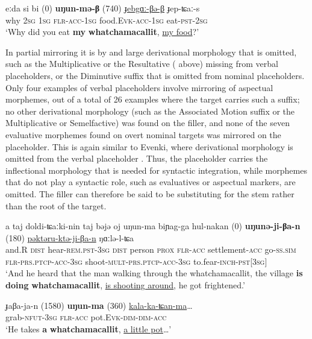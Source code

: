 \documentclass[output=paper]{langscibook}
\begin{document}
\ea \label{ex:pakendorf:16}
\gll eːda
	si bi
	\textup{(0)}
	\textbf{uŋun-mə-β}
	\textup{(740)}
	\uline{ɟebgɑː-βə-β}
	ɟep-ʨaː-s\\
     why
     \textsc{2sg}
     \textsc{1sg}
     {}
     \textsc{flr-acc-1sg}
     {}
     food.\textsc{Evk-acc-1sg}
     eat-\textsc{pst-2sg}\\
\glt ‘Why did you eat \textbf{my} \textbf{whatchamacallit}, \uline{my food}?’ 
\z

In partial mirroring it is by and large derivational morphology that is omitted, such as the Multiplicative  or the Resultative ( above) missing from verbal placeholders, or the Diminutive suffix  that is omitted from nominal placeholders. Only four examples of verbal placeholders involve mirroring of aspectual morphemes, out of a total of 26 examples where the target carries such a suffix; no other derivational morphology (such as the Associated Motion suffix or the Multiplicative or Semelfactive) was found on the filler, and none of the seven evaluative morphemes found on overt nominal targets was mirrored on the placeholder. This is again similar to Evenki, where derivational morphology is omitted from the verbal placeholder \citep[211]{Klyachko2022}. Thus, the placeholder carries the inflectional morphology that is needed for syntactic integration, while morphemes that do not play a syntactic role, such as evaluatives or aspectual markers, are omitted. The filler can therefore be said to be substituting for the stem rather than the root of the target.


\ea \label{ex:pakendorf:17}
\gll a
	taj
	doldi-ʨaːki-nin
	taj
	bəjə
	oj
	uŋun-ma
	biɲag-ga
	hul-nakan
	\textup{(0)}
	\textbf{uŋunə-ji-βa-n}
	\textup{(180)}
	\uline{pəktəru-ktə-ji-βa-n}
	ŋɑːlə-l-ʨa\\
     and.R
     \textsc{dist}
     hear-\textsc{rem.pst-3sg}
     \textsc{dist}
     person
     \textsc{prox}
     \textsc{flr-acc}
     settlement\textsc{-acc}
     go-\textsc{ss.sim}
     {}
     \textsc{flr-prs.ptcp-acc-3sg}
     {}
     shoot-\textsc{mult}-\textsc{prs.ptcp-acc-3sg}
     to.fear-\textsc{inch-pst[3sg]}\\
\glt ‘And he heard that the man walking through the whatchamacallit, the village \textbf{is} \textbf{doing} \textbf{whatchamacallit}, \uline{is shooting around}, he got frightened.’ 
\z


\ea \label{ex:pakendorf:18}
\gll ɟaβa-ja-n 
	\textup{(1580)}
	\textbf{uŋun-ma}
	\textup{(360)}
	\uline{kala-ka-ʨan-ma}…\\
    grab-\textsc{nfut-3sg}
    {}
    \textsc{flr-acc}
    {}
    pot.\textsc{Evk-dim-dim-acc}\\
\glt ‘He takes \textbf{a} \textbf{whatchamacallit}, \uline{a little pot}…’ 
\z
\end{document}

